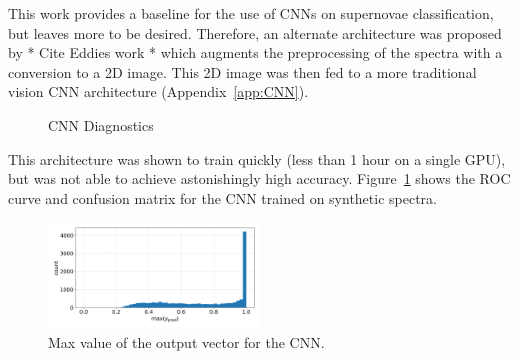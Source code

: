This work provides a baseline for the use of CNNs on supernovae classification, 
but leaves more to be desired. Therefore, an alternate architecture was proposed 
by * Cite Eddies work * which augments the preprocessing of the spectra with 
a conversion to a 2D image. This 2D image was then fed to a more traditional vision 
CNN architecture (Appendix~\ref{app:CNN}). 
\begin{figure}[h]
    \centering
    \qquad
    \caption{CNN Diagnostics\label{fig:cnn_qual}}
\end{figure}
This architecture was shown to train quickly (less than 1 hour on a single GPU), 
but was not able to achieve astonishingly high accuracy. Figure~\ref{fig:cnn_qual}
shows the ROC curve and confusion matrix for the CNN trained on synthetic spectra. 
\begin{figure}[h]
    \centering
    \includegraphics[width=0.5\textwidth]{figures/cnn/cnn_max_ypred.png}
    \caption{Max value of the output vector for the CNN.\label{fig:cnn_max}}
\end{figure}

